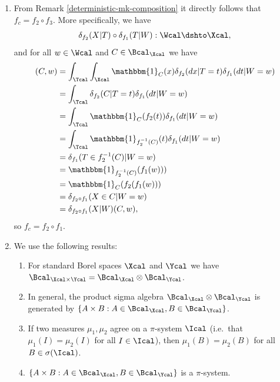 \begin{enumerate}
  \begin{ungradedsolution}
    \begin{enumerate}
      \item From Remark \ref*{deterministic-mk-composition} it directly follows that $f_c = f_2 \circ f_3$. More specifically, we have
      $$\delta_{f_2}(X|T)\circ \delta_{f_1}(T|W) : \Wcal \dshto \Xcal,$$ and for all $w\in \Wcal$ and $C\in \Bcal_{\Xcal}$ we have
      \begin{align*}
        [\delta_{f_2}(X|T)\circ \delta_{f_1}(T|W)](C, w)
         & = \int_\Tcal\int_\Xcal \mathbbm{1}_C(x)\delta_{f_2}(dx|T=t)\delta_{f_1}(dt|W=w) \\
         & = \int_\Tcal \delta_{f_2}(C|T=t)\delta_{f_1}(dt|W=w)                            \\
         & = \int_\Tcal \mathbbm{1}_C(f_2(t))\delta_{f_1}(dt|W=w)                          \\
         & = \int_\Tcal \mathbbm{1}_{f_2^{-1}(C)}(t)\delta_{f_1}(dt|W=w)                   \\
         & = \delta_{f_1}(T\in f_2^{-1}(C)|W=w)                                            \\
         & = \mathbbm{1}_{f_2^{-1}(C)}(f_1(w)))                                            \\
         & = \mathbbm{1}_C(f_2(f_1(w)))                                                    \\
         & = \delta_{f_2\circ f_1}(X\in C|W=w)                                             \\
         & = \delta_{f_2\circ f_1}(X|W)(C, w),
      \end{align*}
      so $f_c = f_2\circ f_1$.
      \item We use the following results:
      \begin{enumerate}
        \item
        For standard Borel spaces $\Xcal$ and $\Ycal$ we have $\Bcal_{\Xcal\times \Ycal} = \Bcal_\Xcal \otimes \Bcal_\Ycal$.
        \item In general, the product sigma algebra $\Bcal_\Xcal \otimes \Bcal_\Ycal$ is generated by $\{A\times B: A\in\Bcal_\Xcal , B\in \Bcal_\Ycal\}$.
        \item If two measures $\mu_1, \mu_2$ agree on a $\pi$-system $\Ical$ (i.e.\ that $\mu_1(I) = \mu_2(I)$ for all $I\in\Ical$), then $\mu_1(B)=\mu_2(B)$ for all $B\in\sigma(\Ical)$.
        \item $\{A\times B: A\in\Bcal_\Xcal , B\in \Bcal_\Ycal\}$ is a $\pi$-system.

\end{enumerate}
\end{enumerate}
\end{ungradedsolution}
\end{enumerate}
